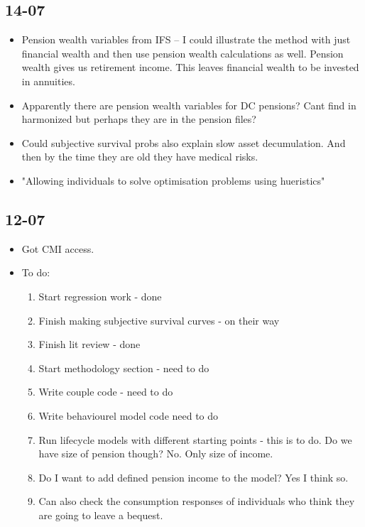 \documentclass[12pt]{article}
\begin{document}
\subsection{\textbf{14-07}}
\begin{itemize}
    \item Pension wealth variables from IFS -- I could illustrate
          the method with just financial wealth and then use pension wealth calculations
          as well. Pension wealth gives us retirement income. This leaves financial wealth to be
          invested in annuities.

    \item Apparently there are pension wealth variables for DC pensions?
          Cant find in harmonized but perhaps they are in the pension files?

    \item Could subjective survival probs also explain slow asset decumulation. And then by the time they are old
          they have medical risks.

    \item "Allowing individuals to solve optimisation problems using hueristics"
\end{itemize}

\subsection{\textbf{12-07}}
\begin{itemize}

    \item Got CMI access.

    \item To do: \begin{enumerate}
              \item Start regression work - done
              \item Finish making subjective survival curves - on their way
              \item Finish lit review - done
              \item Start methodology section - need to do
              \item Write couple code - need to do
              \item Write behaviourel model code need to do
              \item Run lifecycle models with different starting points - this is to do.
                    Do we have size of pension though? No. Only size of income.

              \item Do I want to add defined pension income to the model? Yes I think so.
              \item Can also check the consumption responses of individuals who think they are going to leave a bequest.
          \end{enumerate}
\end{itemize}
\end{document}
